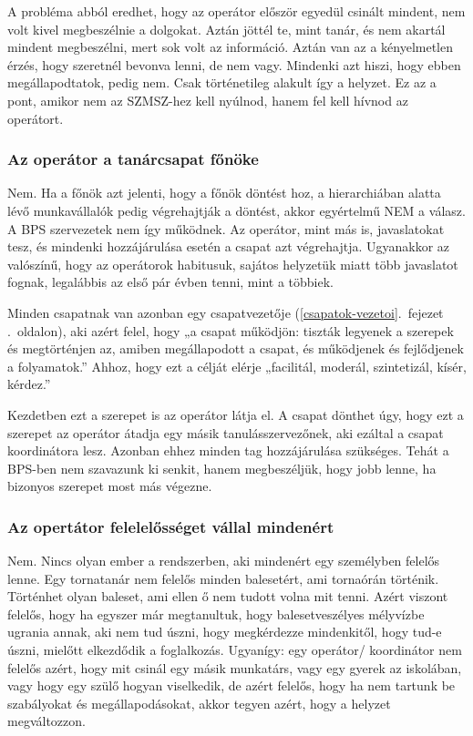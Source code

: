 A probléma abból eredhet, hogy az operátor először egyedül csinált
mindent, nem volt kivel megbeszélnie a dolgokat. Aztán jöttél te, mint
tanár, és nem akartál mindent megbeszélni, mert sok volt az információ.
Aztán van az a kényelmetlen érzés, hogy szeretnél bevonva lenni, de nem
vagy. Mindenki azt hiszi, hogy ebben megállapodtatok, pedig nem. Csak
történetileg alakult így a helyzet. Ez az a pont, amikor nem az
SZMSZ-hez kell nyúlnod, hanem fel kell hívnod az operátort.

\hypertarget{az-operator-a-tanarcsapat-fonoke}{%
\subsubsection{Az operátor a tanárcsapat
főnöke}\label{az-operator-a-tanarcsapat-fonoke}}

Nem. Ha a főnök azt jelenti, hogy a főnök döntést hoz, a hierarchiában
alatta lévő munkavállalók pedig végrehajtják a döntést, akkor egyértelmű
NEM a válasz. A BPS szervezetek nem így működnek. Az operátor, mint más
is, javaslatokat tesz, és mindenki hozzájárulása esetén a csapat azt
végrehajtja. Ugyanakkor az valószínű, hogy az operátorok habitusuk,
sajátos helyzetük miatt több javaslatot fognak, legalábbis az első pár
évben tenni, mint a többiek.

Minden csapatnak van azonban egy
csapatvezetője (\ref{csapatok-vezetoi}.~fejezet .~oldalon),
aki azért felel, hogy „a csapat működjön: tiszták legyenek a szerepek és
megtörténjen az, amiben megállapodott a csapat, és működjenek és
fejlődjenek a folyamatok.'' Ahhoz, hogy ezt a célját elérje „facilitál,
moderál, szintetizál, kísér, kérdez.''

Kezdetben ezt a szerepet is az operátor látja el. A csapat dönthet úgy,
hogy ezt a szerepet az operátor átadja egy másik tanulásszervezőnek, aki
ezáltal a csapat koordinátora lesz. Azonban ehhez minden tag
hozzájárulása szükséges. Tehát a BPS-ben nem szavazunk ki senkit, hanem
megbeszéljük, hogy jobb lenne, ha bizonyos szerepet most más végezne.

\hypertarget{az-opertator-felelelosseget-vallal-mindenert}{%
\subsubsection{Az opertátor felelelősséget vállal
mindenért}\label{az-opertator-felelelosseget-vallal-mindenert}}

Nem. Nincs olyan ember a rendszerben, aki mindenért egy személyben
felelős lenne. Egy tornatanár nem felelős minden balesetért, ami
tornaórán történik. Történhet olyan baleset, ami ellen ő nem tudott
volna mit tenni. Azért viszont felelős, hogy ha egyszer már megtanultuk,
hogy balesetveszélyes mélyvízbe ugrania annak, aki nem tud úszni, hogy
megkérdezze mindenkitől, hogy tud-e úszni, mielőtt elkezdődik a
foglalkozás. Ugyanígy: egy operátor/ koordinátor nem felelős azért, hogy
mit csinál egy másik munkatárs, vagy egy gyerek az iskolában, vagy hogy
egy szülő hogyan viselkedik, de azért felelős, hogy ha nem tartunk be
szabályokat és megállapodásokat, akkor tegyen azért, hogy a helyzet
megváltozzon.

